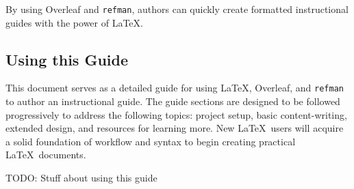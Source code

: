 By using Overleaf and \texttt{refman}, authors can quickly create formatted instructional guides with the power of \LaTeX.

\subsection{Using this Guide}
This document serves as a detailed guide for using \LaTeX, Overleaf, and \texttt{refman} to author an instructional guide. The guide sections are designed to be followed progressively to address the following topics: project setup, basic content-writing, extended design, and resources for learning more. New \LaTeX\ users will acquire a solid foundation of workflow and syntax to begin creating practical \LaTeX\ documents.
\par
TODO: Stuff about using this guide